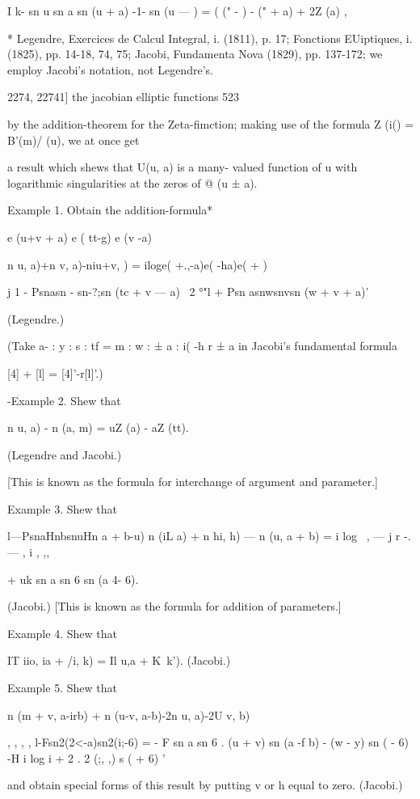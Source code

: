 I k- sn u sn a sn (u + a) -1- sn (u — ) = ( (" - ) - (" + a) + 2Z (a)
,

* Legendre, Exercices de Calcul Integral, i. (1811), p. 17; Fonctions
EUiptiques, i. (1825), pp. 14-18, 74, 75; Jacobi, Fundamenta Nova
(1829), pp. 137-172; we employ Jacobi's notation, not Legendre's.

2274, 22741] the jacobian elliptic functions 523

by the addition-theorem for the Zeta-fimction; making use of the
formula Z (i() = B'(m)/ (u), we at once get

a result which shews that U(u, a) is a many- valued function of u with
logarithmic singularities at the zeros of @ (u ± a).

Example 1. Obtain the addition-formula*

e (u+v + a) e ( tt-g) e (v -a)

n u, a)+n v, a)-niu+v, ) = iloge( +.,-a)e( -ha)e( + )

j 1 - Psnasn - sn-?;sn (tc + v — a) ~2 °"l + Psn asnwsnvsn (w + v +
a)'

(Legendre.)

(Take a- : y : s : tf = m : w : ± a : i( -h r ± a in Jacobi's
fundamental formula

[4] + [l] = [4]'-r[l]'.)

-Example 2. Shew that

n u, a) - n (a, m) = uZ (a) - aZ (tt).

(Legendre and Jacobi.)

[This is known as the formula for interchange of argument and
parameter.]

Example 3. Shew that

l—PsnaHnbsnuHn a + b-u) n (iL a) + n hi, h) — n (u, a + b) = i log \ ,
— j r -. — , i , ,,\

+ uk sn a sn 6 sn (a 4- 6).

(Jacobi.) [This is known as the formula for addition of parameters.]

Example 4. Shew that

IT iio, ia + /i, k) = Il u,a + K\ k'). (Jacobi.)

Example 5. Shew that

n (m + v, a-irb) + n (u-v, a-b)-2n u, a)-2U v, b)

, , , , l-Fsn2(2<-a)sn2(i;-6) = - F sn a sn 6 . (u + v) sn (a -f b) -
(w - y) sn ( - 6) -H i log i + 2 . 2 (;, ,) s ( + 6) '

and obtain special forms of this result by putting v or h equal to
zero. (Jacobi.)

